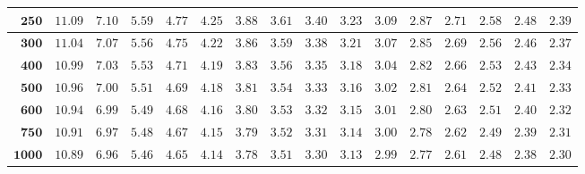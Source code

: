 \begin{alternateColorTable}
\begin{longtable}{|r|r|r|r|r|r|r|r|r|r|r|r|r|r|r|r|}
    \(\mathbf{250}\) & \(11.09\) & \(7.10\) & \(5.59\) & \(4.77\) & \(4.25\) & \(3.88\) & \(3.61\) & \(3.40\) & \(3.23\) & \(3.09\) & \(2.87\) & \(2.71\) & \(2.58\) & \(2.48\) & \(2.39\) \\ \hline 
    \(\mathbf{300}\) & \(11.04\) & \(7.07\) & \(5.56\) & \(4.75\) & \(4.22\) & \(3.86\) & \(3.59\) & \(3.38\) & \(3.21\) & \(3.07\) & \(2.85\) & \(2.69\) & \(2.56\) & \(2.46\) & \(2.37\) \\ \hline 
    \(\mathbf{400}\) & \(10.99\) & \(7.03\) & \(5.53\) & \(4.71\) & \(4.19\) & \(3.83\) & \(3.56\) & \(3.35\) & \(3.18\) & \(3.04\) & \(2.82\) & \(2.66\) & \(2.53\) & \(2.43\) & \(2.34\) \\ \hline 
    \(\mathbf{500}\) & \(10.96\) & \(7.00\) & \(5.51\) & \(4.69\) & \(4.18\) & \(3.81\) & \(3.54\) & \(3.33\) & \(3.16\) & \(3.02\) & \(2.81\) & \(2.64\) & \(2.52\) & \(2.41\) & \(2.33\) \\ \hline 
    \(\mathbf{600}\) & \(10.94\) & \(6.99\) & \(5.49\) & \(4.68\) & \(4.16\) & \(3.80\) & \(3.53\) & \(3.32\) & \(3.15\) & \(3.01\) & \(2.80\) & \(2.63\) & \(2.51\) & \(2.40\) & \(2.32\) \\ \hline 
    \(\mathbf{750}\) & \(10.91\) & \(6.97\) & \(5.48\) & \(4.67\) & \(4.15\) & \(3.79\) & \(3.52\) & \(3.31\) & \(3.14\) & \(3.00\) & \(2.78\) & \(2.62\) & \(2.49\) & \(2.39\) & \(2.31\) \\ \hline 
    \(\mathbf{1000}\) & \(10.89\) & \(6.96\) & \(5.46\) & \(4.65\) & \(4.14\) & \(3.78\) & \(3.51\) & \(3.30\) & \(3.13\) & \(2.99\) & \(2.77\) & \(2.61\) & \(2.48\) & \(2.38\) & \(2.30\) \\ \hline
\end{longtable}
\end{alternateColorTable}
\changefontsizes{11pt}

\setlength{\LTleft}{0in} %
\setlength{\LTright}{0in} %


\newpage

